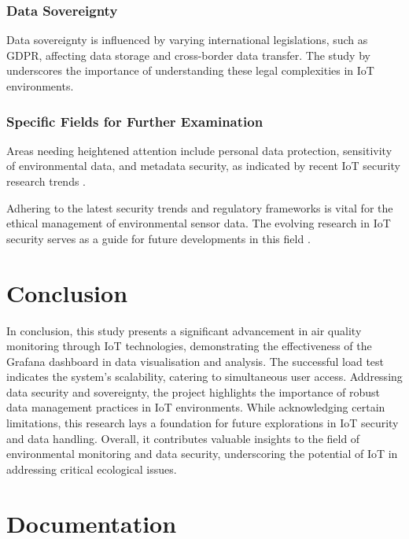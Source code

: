 \documentclass[12pt,oneside]{book} %
\begin{document}
\subsection{Data Sovereignty}
Data sovereignty is influenced by varying international legislations, such as
GDPR, affecting data storage and cross-border data transfer. The study by
\citeauthor{CurrentResearchIoTSecurity2020} underscores the importance of
understanding these legal complexities in IoT environments.

\subsection{Specific Fields for Further Examination}
Areas needing heightened attention include personal data protection,
sensitivity of environmental data, and metadata security, as indicated by
recent IoT security research trends \cite{CurrentResearchIoTSecurity2020}.

Adhering to the latest security trends and regulatory frameworks is vital for
the ethical management of environmental sensor data. The evolving research in
IoT security serves as a guide for future developments in this field
\cite{CurrentResearchIoTSecurity2020}.

\newpage
\chapter{Conclusion}

In conclusion, this study presents a significant advancement in air quality
monitoring through IoT technologies, demonstrating the effectiveness of the
Grafana dashboard in data visualisation and analysis. The successful load test
indicates the system's scalability, catering to simultaneous user access.
Addressing data security and sovereignty, the project highlights the importance
of robust data management practices in IoT environments. While acknowledging
certain limitations, this research lays a foundation for future explorations in
IoT security and data handling. Overall, it contributes valuable insights to
the field of environmental monitoring and data security, underscoring the
potential of IoT in addressing critical ecological issues.




\appendix
\chapter{Documentation}
\end{document}
